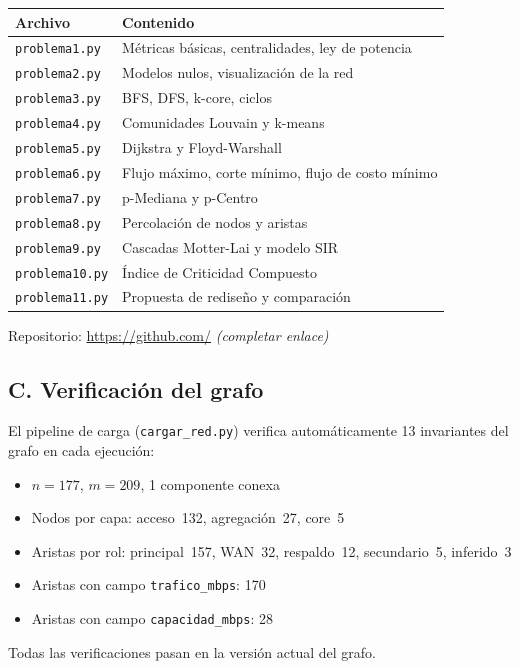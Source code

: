 \documentclass[12pt, a4paper]{article}
\newcommand{\code}[1]{\texttt{\small #1}}
\begin{document}
\begin{center}
\small
\begin{tabular}{ll}
    \toprule
    \textbf{Archivo} & \textbf{Contenido} \\
    \midrule
    \code{problema1.py}  & Métricas básicas, centralidades, ley de potencia \\
    \code{problema2.py}  & Modelos nulos, visualización de la red \\
    \code{problema3.py}  & BFS, DFS, k-core, ciclos \\
    \code{problema4.py}  & Comunidades Louvain y k-means \\
    \code{problema5.py}  & Dijkstra y Floyd-Warshall \\
    \code{problema6.py}  & Flujo máximo, corte mínimo, flujo de costo mínimo \\
    \code{problema7.py}  & p-Mediana y p-Centro \\
    \code{problema8.py}  & Percolación de nodos y aristas \\
    \code{problema9.py}  & Cascadas Motter-Lai y modelo SIR \\
    \code{problema10.py} & Índice de Criticidad Compuesto \\
    \code{problema11.py} & Propuesta de rediseño y comparación \\
    \bottomrule
\end{tabular}
\end{center}

Repositorio: \url{https://github.com/} \textit{(completar enlace)}

\subsection*{C. Verificación del grafo}

El pipeline de carga (\code{cargar\_red.py}) verifica automáticamente 13
invariantes del grafo en cada ejecución:

\begin{itemize}
    \item $n = 177$, $m = 209$, 1 componente conexa
    \item Nodos por capa: acceso~132, agregación~27, core~5
    \item Aristas por rol: principal~157, WAN~32, respaldo~12,
          secundario~5, inferido~3
    \item Aristas con campo \code{trafico\_mbps}: 170
    \item Aristas con campo \code{capacidad\_mbps}: 28
\end{itemize}

Todas las verificaciones pasan en la versión actual del grafo.
\end{document}
